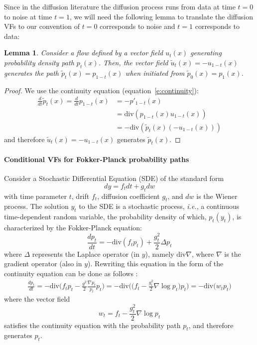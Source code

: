 \documentclass{article}
\makeatletter
\newcommand{\divv}{\mathrm{div}} %
\newcommand{\ie}{{i.e.}}
\newtheorem{lemma}{Lemma}
\def\eqref#1{equation~\ref{#1}}
\renewcommand*{\ie}{{\it i.e.}\@\xspace}
\makeatother
\begin{document}
Since in the diffusion literature the diffusion process runs from data at time $t=0$ to noise at time $t=1$, we will need the following lemma to translate the diffusion VFs to our convention of $t=0$ corresponds to noise and $t=1$ corresponds to data:
\begin{lemma}\label{lem:reverse}
Consider a flow defined by a vector field $u_t(x)$ generating probability density path $p_t(x)$. Then, the vector field $\tilde{u}_t(x) = -u_{1-t}(x)$ generates the path $\tilde{p}_t(x) = p_{1-t}(x)$ when initiated from $\tilde{p}_0(x) = p_1(x)$.
\end{lemma}
\begin{proof}
We use the continuity equation (\eqref{e:continuity}):
\begin{align*}
    \frac{d}{dt}\tilde{p}_t(x)=\frac{d}{dt}p_{1-t}(x) &= -p'_{1-t}(x) \\
    &= \divv(p_{1-t}(x)u_{1-t}(x)) \\
    &= -\divv(\tilde{p}_{t}(x)(-u_{1-t}(x))) 
\end{align*}
and therefore $\tilde{u}_t(x)=-u_{1-t}(x)$ generates $\tilde{p}_t(x)$. 
\end{proof}


\paragraph{Conditional VFs for Fokker-Planck probability paths} Consider a Stochastic Differential Equation (SDE) of the standard form
\begin{equation}\label{e:sde}
    dy = f_t dt + g_t dw
\end{equation}
with time parameter $t$, drift $f_t$, diffusion coefficient $g_t$, and $dw$ is the Wiener process. The solution $y_t$ to the SDE is a stochastic process, \ie, a continuous time-dependent random variable, the probability density of which, $p_t(y_t)$, is characterized by the Fokker-Planck equation:
\begin{equation}
    \frac{dp_t}{dt} = -\mathrm{div}(f_t p_t) + \frac{g_t^2}{2}\Delta p_t
\end{equation}
where $\Delta$ represents the Laplace operator (in $y$), namely $\mathrm{div}\nabla$, where $\nabla$ is the gradient operator (also in $y$). Rewriting this equation in the form of the continuity equation can be done as follows \citep{maoutsa2020}:
\begin{align*}
    \frac{dp_t}{dt} 
    = -\mathrm{div}\Big( f_t p_t - \frac{g^2}{2}\frac{\nabla p_t}{p_t}p_t \Big) 
    = -\mathrm{div}\Big(\big( f_t - \frac{g_t^2}{2}\nabla \log p_t\big)p_t \Big) = -\mathrm{div}\Big( w_t p_t \Big)
\end{align*}
where the vector field
\begin{equation}\label{e:w}
    w_t = f_t - \frac{g_t^2}{2}\nabla \log p_t
\end{equation}
satisfies the continuity equation with the probability path $p_t$, and therefore generates $p_t$. 
\end{document}
